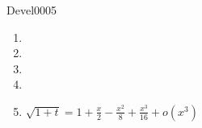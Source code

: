 
\begin{corrige}{Devel0005}

\begin{enumerate}

\item
\item
\item
\item
\item
$\sqrt{1+t}=1+\frac{ x }{ 2 }-\frac{ x^2 }{ 8 }+\frac{ x^3 }{ 16 }+o(x^3)$

\end{enumerate}

\end{corrige}
